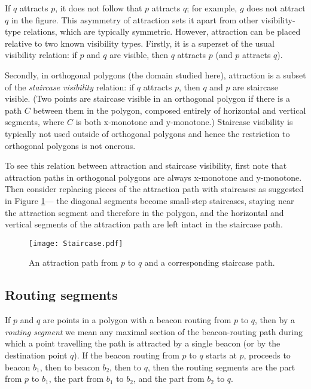 \documentclass{article}
\begin{document}
		If $q$ attracts $p$, it does not follow that $p$ attracts $q$; for example,
		$g$ does not attract $q$ in the figure.
		This asymmetry of attraction sets it apart from other visibility-type
		relations, which are typically symmetric.
		However, attraction can be placed relative to two known visibility types.
		Firstly, it is a superset of the usual visibility relation: if $p$ and
		$q$ are visible, then $q$ attracts $p$ (and $p$ attracts $q$).
		
		Secondly, in orthogonal polygons (the domain studied here), attraction is a
		subset of the \emph{staircase visibility} relation: if $q$ attracts $p$,
		then $q$ and $p$ are staircase visible.
		(Two points are staircase visible in an orthogonal polygon if there is a path
		$C$ between them in the polygon, composed entirely of horizontal and vertical
		segments, where $C$ is both x-monotone and y-monotone.)
		Staircase visibility is typically not used outside of orthogonal polygons
		and hence the restriction to orthogonal polygons is not onerous.
		
		To see this relation between attraction and staircase visibility, first note
		that attraction paths in orthogonal polygons are always x-monotone and
		y-monotone.  Then consider replacing pieces of the attraction path with
		staircases as suggested in Figure \ref{fig:staircase}---
		the diagonal segments become small-step staircases,
		staying near the attraction segment and therefore in the polygon, and the horizontal and
		vertical segments of the attraction path are left intact in the staircase
		path.
	
		\begin{figure}[htbp] 
			\begin{center}
			    \texttt{[image: Staircase.pdf]} 
			\end{center}
			\caption{
				An attraction path from $p$ to $q$ and a corresponding staircase path.
				}
			\label{fig:staircase}
		\end{figure}
		
	\subsection{Routing segments}
		If $p$ and $q$ are points in a polygon with a beacon routing from $p$ to $q$,
		then by a \emph{routing segment} we mean any maximal section of the
		beacon-routing path during which a point travelling the path is attracted by
		a single beacon (or by the destination point $q$).  If the beacon routing from 
		$p$ to $q$ starts at $p$, proceeds to beacon $b_1$, then to beacon $b_2$, then 
		to $q$, then the routing segments are the part from $p$ to $b_1$, the part
		from $b_1$ to $b_2$, and the part from $b_2$ to $q$.
	
\end{document}

